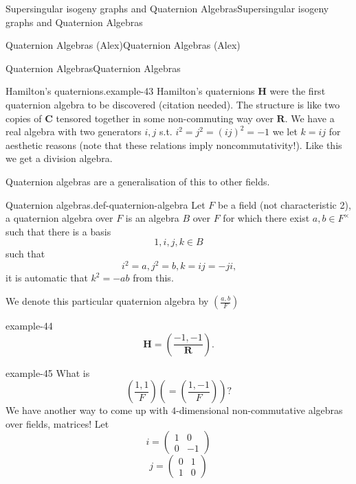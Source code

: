 \documentclass[10pt,]{book}
\numberwithin{equation}{section}
\newcommand{\legendre}[2]{\left(\frac{#1}{#2}\right)}
\newcommand{\RR}{\mathbf{R}}
\newcommand{\CC}{\mathbf{C}}
\newcommand{\HH}{\mathbf{H}}
\newcommand{\amp}{&}
\begin{document}
\begin{chapterptx}{Supersingular isogeny graphs and Quaternion Algebras}{}{Supersingular isogeny graphs and Quaternion Algebras}{}{}
\begin{sectionptx}{Quaternion Algebras (Alex)}{}{Quaternion Algebras (Alex)}{}{}
\begin{subsectionptx}{Quaternion Algebras}{}{Quaternion Algebras}{}{}
\begin{introduction}{}
\begin{example}{Hamilton's quaternions.}{example-43}%
\hypertarget{p-887}{}%
Hamilton's quaternions \(\HH\) were the first quaternion algebra to be discovered (citation needed). The structure is like two copies of \(\CC\) tensored together in some non-commuting way over \(\RR\). We have a real algebra with two generators \(i,j\) s.t. \(i^2 = j^2  = (ij)^2 = -1\) we let \(k = ij\) for aesthetic reasons (note that these relations imply noncommutativity!). Like this we get a division algebra.%
\end{example}
\hypertarget{p-888}{}%
Quaternion algebras are a generalisation of this to other fields.%
\begin{definition}{Quaternion algebras.}{def-quaternion-algebra}%
\hypertarget{p-889}{}%
Let \(F\) be a field (not characteristic 2), a quaternion algebra over \(F\) is an algebra \(B\) over \(F\) for which there exist \(a,b\in F^\times\) such that there is a basis%
\begin{equation*}
1,i,j,k \in B
\end{equation*}
such that%
\begin{equation*}
i^2 = a,j^2=b,k=ij=-ji\text{,}
\end{equation*}
it is automatic that \(k^2 = -ab\) from this.%
\par
\hypertarget{p-890}{}%
We denote this particular quaternion algebra by \(\legendre{a,b}{F}\)%
\end{definition}
\begin{example}{}{example-44}%
\hypertarget{p-891}{}%
%
\begin{equation*}
\HH = \legendre{-1,-1}{\RR}\text{.}
\end{equation*}
%
\end{example}
\begin{example}{}{example-45}%
\hypertarget{p-892}{}%
What is%
\begin{equation*}
\legendre{1,1}{F} \left( = \legendre{1,-1}{F}\right)\text{?}
\end{equation*}
We have another way to come up with \(4\)-dimensional non-commutative algebras over fields, matrices! Let%
\begin{equation*}
i=  \begin{pmatrix} 1\amp0\\0\amp -1\end{pmatrix}
\end{equation*}
%
\begin{equation*}
j =\begin{pmatrix} 0\amp1\\1\amp 0\end{pmatrix}

\end{equation*}
\end{example}
\end{introduction}
\end{subsectionptx}
\end{sectionptx}
\end{chapterptx}
\end{document}
